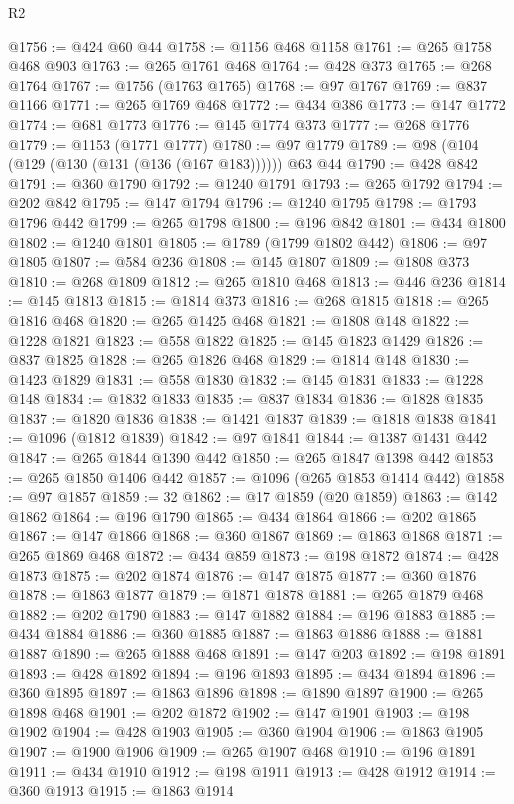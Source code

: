\begin{lexlean}{R2}
\begin{coremodule}
@1756 := @424 @60 @44
@1758 := @1156 @468 @1158
@1761 := @265 @1758 @468 @903
@1763 := @265 @1761 @468
@1764 := @428 @373
@1765 := @268 @1764
@1767 := @1756 (@1763 @1765)
@1768 := @97 @1767
@1769 := @837 @1166
@1771 := @265 @1769 @468
@1772 := @434 @386
@1773 := @147 @1772
@1774 := @681 @1773
@1776 := @145 @1774 @373
@1777 := @268 @1776
@1779 := @1153 (@1771 @1777)
@1780 := @97 @1779
@1789 := @98 (@104 (@129 (@130 (@131 (@136 (@167 @183)))))) @63 @44
@1790 := @428 @842
@1791 := @360 @1790
@1792 := @1240 @1791
@1793 := @265 @1792
@1794 := @202 @842
@1795 := @147 @1794
@1796 := @1240 @1795
@1798 := @1793 @1796 @442
@1799 := @265 @1798
@1800 := @196 @842
@1801 := @434 @1800
@1802 := @1240 @1801
@1805 := @1789 (@1799 @1802 @442)
@1806 := @97 @1805
@1807 := @584 @236
@1808 := @145 @1807
@1809 := @1808 @373
@1810 := @268 @1809
@1812 := @265 @1810 @468
@1813 := @446 @236
@1814 := @145 @1813
@1815 := @1814 @373
@1816 := @268 @1815
@1818 := @265 @1816 @468
@1820 := @265 @1425 @468
@1821 := @1808 @148
@1822 := @1228 @1821
@1823 := @558 @1822
@1825 := @145 @1823 @1429
@1826 := @837 @1825
@1828 := @265 @1826 @468
@1829 := @1814 @148
@1830 := @1423 @1829
@1831 := @558 @1830
@1832 := @145 @1831
@1833 := @1228 @148
@1834 := @1832 @1833
@1835 := @837 @1834
@1836 := @1828 @1835
@1837 := @1820 @1836
@1838 := @1421 @1837
@1839 := @1818 @1838
@1841 := @1096 (@1812 @1839)
@1842 := @97 @1841
@1844 := @1387 @1431 @442
@1847 := @265 @1844 @1390 @442
@1850 := @265 @1847 @1398 @442
@1853 := @265 @1850 @1406 @442
@1857 := @1096 (@265 @1853 @1414 @442)
@1858 := @97 @1857
@1859 := 32
@1862 := @17 @1859 (@20 @1859)
@1863 := @142 @1862
@1864 := @196 @1790
@1865 := @434 @1864
@1866 := @202 @1865
@1867 := @147 @1866
@1868 := @360 @1867
@1869 := @1863 @1868
@1871 := @265 @1869 @468
@1872 := @434 @859
@1873 := @198 @1872
@1874 := @428 @1873
@1875 := @202 @1874
@1876 := @147 @1875
@1877 := @360 @1876
@1878 := @1863 @1877
@1879 := @1871 @1878
@1881 := @265 @1879 @468
@1882 := @202 @1790
@1883 := @147 @1882
@1884 := @196 @1883
@1885 := @434 @1884
@1886 := @360 @1885
@1887 := @1863 @1886
@1888 := @1881 @1887
@1890 := @265 @1888 @468
@1891 := @147 @203
@1892 := @198 @1891
@1893 := @428 @1892
@1894 := @196 @1893
@1895 := @434 @1894
@1896 := @360 @1895
@1897 := @1863 @1896
@1898 := @1890 @1897
@1900 := @265 @1898 @468
@1901 := @202 @1872
@1902 := @147 @1901
@1903 := @198 @1902
@1904 := @428 @1903
@1905 := @360 @1904
@1906 := @1863 @1905
@1907 := @1900 @1906
@1909 := @265 @1907 @468
@1910 := @196 @1891
@1911 := @434 @1910
@1912 := @198 @1911
@1913 := @428 @1912
@1914 := @360 @1913
@1915 := @1863 @1914

\end{coremodule}
\end{lexlean}
